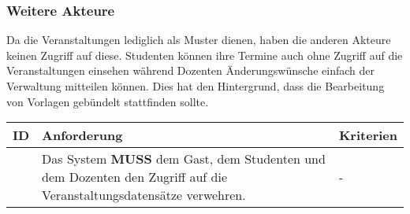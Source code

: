 \newpage

\subsubsection{Weitere Akteure}
Da die Veranstaltungen lediglich als Muster dienen, haben die anderen Akteure keinen Zugriff auf diese. Studenten können ihre Termine auch ohne Zugriff auf die Veranstaltungen einsehen während Dozenten Änderungswünsche einfach der Verwaltung mitteilen können. Dies hat den Hintergrund, dass die Bearbeitung von Vorlagen gebündelt stattfinden sollte.
\begin{tabular} {|p{}|p{}|p{}|}
	\hline
	ID & Anforderung & Kriterien \\
	\hline
	\printfreqnr
	& Das System \textbf{MUSS} dem Gast, dem Studenten und dem Dozenten den Zugriff auf die Veranstaltungsdatensätze verwehren.
	& - \\
	\hline
\end{tabular}

\newpage

